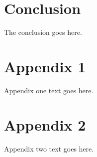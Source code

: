 \documentclass[journal]{./IEEEtran}
\begin{document}



\section{Conclusion}
The conclusion goes here.






%


\appendices
\section{Appendix 1}
Appendix one text goes here.

\section{Appendix 2}
Appendix two text goes here.
\end{document}
